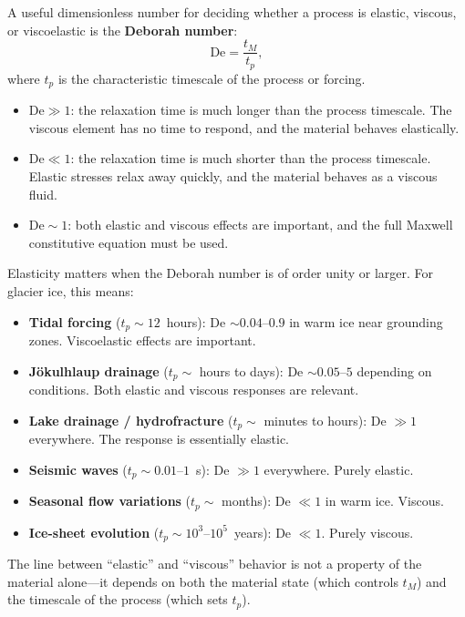 \documentclass[11pt]{article}
\begin{document}
A useful dimensionless number for deciding whether a process is elastic, viscous, or viscoelastic is the \textbf{Deborah number}:
\begin{equation}
  \text{De} = \frac{t_M}{t_p},
  \label{eq:deborah}
\end{equation}
where $t_p$ is the characteristic timescale of the process or forcing.
\begin{itemize}
  \item $\text{De} \gg 1$: the relaxation time is much longer than the process timescale.  The viscous element has no time to respond, and the material behaves elastically.
  \item $\text{De} \ll 1$: the relaxation time is much shorter than the process timescale.  Elastic stresses relax away quickly, and the material behaves as a viscous fluid.
  \item $\text{De} \sim 1$: both elastic and viscous effects are important, and the full Maxwell constitutive equation must be used.
\end{itemize}

\begin{tcolorbox}[
  colback=blue!5,
  colframe=blue!50!black,
  title={\textbf{Key point: when does elasticity matter?}}
]
Elasticity matters when the Deborah number is of order unity or larger.  For glacier ice, this means:
\begin{itemize}
  \item \textbf{Tidal forcing} ($t_p \sim 12$~hours): De $\sim 0.04$--$0.9$ in warm ice near grounding zones.  Viscoelastic effects are important.
  \item \textbf{J\"{o}kulhlaup drainage} ($t_p \sim$ hours to days): De $\sim 0.05$--$5$ depending on conditions.  Both elastic and viscous responses are relevant.
  \item \textbf{Lake drainage / hydrofracture} ($t_p \sim$ minutes to hours): De $\gg 1$ everywhere.  The response is essentially elastic.
  \item \textbf{Seismic waves} ($t_p \sim 0.01$--$1$~s): De $\gg 1$ everywhere.  Purely elastic.
  \item \textbf{Seasonal flow variations} ($t_p \sim$ months): De $\ll 1$ in warm ice.  Viscous.
  \item \textbf{Ice-sheet evolution} ($t_p \sim 10^3$--$10^5$~years): De $\ll 1$.  Purely viscous.
\end{itemize}
The line between ``elastic'' and ``viscous'' behavior is not a property of the material alone---it depends on both the material state (which controls $t_M$) and the timescale of the process (which sets $t_p$).
\end{tcolorbox}
\end{document}
